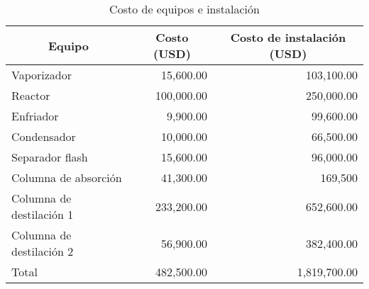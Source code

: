 \begin{table}[H]
    \centering
    \caption{Costo de equipos e instalación}
    \label{tab:equipos}
    \begin{tabular}{l|r|r}
    \hline
    \multicolumn{1}{c|}{Equipo} & \multicolumn{1}{c|}{Costo (USD)} & \multicolumn{1}{c}{Costo de instalación (USD)} \\ \hline
    Vaporizador                 & 15,600.00                        & 103,100.00                                     \\
    Reactor                     & 100,000.00                       & 250,000.00                                     \\
    Enfriador                   & 9,900.00                         & 99,600.00                                      \\
    Condensador                 & 10,000.00                           & 66,500.00                                      \\
    Separador flash             & 15,600.00                           & 96,000.00                                      \\
    Columna de absorción        & 41,300.00                           & 169,500                                        \\
    Columna de destilación 1    & 233,200.00                       & 652,600.00                                     \\
    Columna de destilación 2    & 56,900.00                           & 382,400.00                                     \\ \hline
    Total                       & 482,500.00                       & 1,819,700.00     \\ \hline                             
    \end{tabular}
\end{table}
